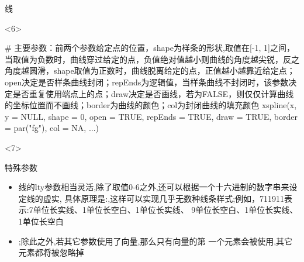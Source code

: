 \begin{frame}[t,fragile]{\subsecname}{线}
\begin{onlyenv}<6>
\begin{rcode}
# 主要参数：前两个参数给定点的位置，shape为样条的形状,取值在[-1, 1]之间，当取值为负数时，曲线穿过给定的点，负值绝对值越小则曲线的角度越尖锐，反之角度越圆滑，shape取值为正数时，曲线脱离给定的点，正值越小越靠近给定点；open决定是否样条曲线封闭；repEnds为逻辑值，当样条曲线不封闭时，该参数决定是否重复使用端点上的点；draw决定是否画线，若为FALSE，则仅仅计算曲线的坐标位置而不画线；border为曲线的颜色；col为封闭曲线的填充颜色
xspline(x, y = NULL, shape = 0, open = TRUE, repEnds = TRUE, draw = TRUE, border = par("fg"), col = NA, ...)
\end{rcode}
\end{onlyenv} 

\begin{onlyenv}<7>
\begin{block}{\small 特殊参数}\footnotesize 
\begin{itemize}
\item[\HandPencilLeft] 线的lty参数相当灵活,除了取值0-6之外,还可以根据一个十六进制的数字串来设定线的虚实,
具体原理是:,这样可以实现几乎无数种线条样式;例如，711911表示:7单位长实线、1单位长空白、1单位长实线、
9单位长空白、1单位长实线、1单位长空白
\item[\HandPencilLeft] ;除此之外,若其它参数使用了向量,那么只有向量的第
一个元素会被使用,其它元素都将被忽略掉
\end{itemize}
\end{block}
\end{onlyenv}  
\end{frame}

